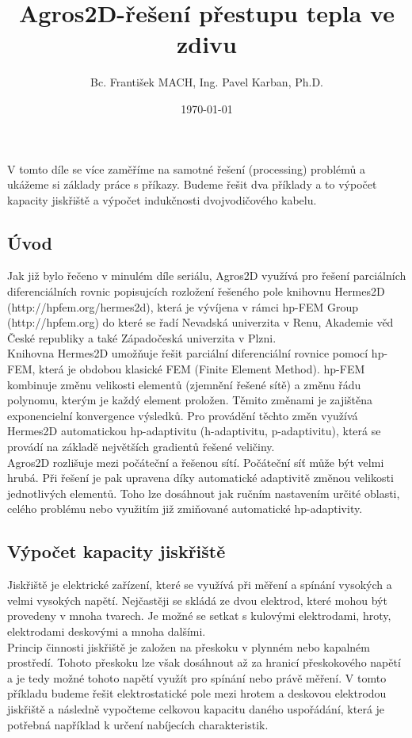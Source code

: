 \documentclass[a4paper, oneside]{article}
\begin{document}
\author{Bc. František MACH, Ing. Pavel Karban, Ph.D.}
\date{\today}
\title{Agros2D-řešení přestupu tepla ve zdivu}
\maketitle
 V tomto díle se více zaměříme na samotné řešení (processing) problémů a ukážeme si základy práce s příkazy. Budeme řešit dva příklady a to výpočet kapacity jiskřiště a výpočet indukčnosti dvojvodičového kabelu.
	
\tableofcontents
\newpage
 \subsection{Úvod}
Jak již bylo řečeno v minulém díle seriálu, Agros2D využívá pro řešení parciálních diferenciálních rovnic popisujcích rozložení řešeného pole knihovnu Hermes2D \\(http://hpfem.org/hermes2d), která je vývíjena v rámci hp-FEM Group \\(http://hpfem.org) do které se řadí Nevadská univerzita v Renu, Akademie věd České republiky a také Západočeská univerzita v Plzni.\\

	Knihovna Hermes2D umožňuje řešit parciální diferenciální rovnice pomocí hp-FEM, která je obdobou klasické FEM (Finite Element Method). hp-FEM kombinuje změnu velikosti elementů (zjemnění řešené sítě) a změnu řádu polynomu, kterým je každý element proložen. Těmito změnami je zajištěna exponencielní konvergence výsledků. Pro provádění těchto změn využívá Hermes2D automatickou hp-adaptivitu (h-adaptivitu, p-adaptivitu), která se provádí na základě největších gradientů řešené veličiny.\\

	Agros2D rozlišuje mezi počáteční a řešenou sítí. Počáteční síť může být velmi hrubá. Při řešení je pak upravena díky automatické adaptivitě změnou velikosti jednotlivých elementů. Toho lze dosáhnout jak ručním nastavením určité oblasti, celého problému nebo využitím již zmiňované automatické hp-adaptivity.\\
\newpage
\subsection{Výpočet kapacity jiskřiště} 
Jiskřiště je elektrické zařízení, které se využívá při měření a spínání vysokých a velmi vysokých napětí. Nejčastěji se skládá ze dvou elektrod, které mohou být provedeny v mnoha tvarech. Je možné se setkat s kulovými elektrodami, hroty, elektrodami deskovými a mnoha dalšími.\\
Princip činnosti jiskřiště je založen na přeskoku v plynném nebo kapalném prostředí. Tohoto přeskoku lze však dosáhnout až za hranicí přeskokového napětí a je tedy možné tohoto napětí využít pro spínání nebo právě měření. V tomto příkladu budeme řešit elektrostatické pole mezi hrotem a deskovou elektrodou jiskřiště a následně vypočteme celkovou kapacitu daného uspořádání, která je potřebná například k určení nabíjecích charakteristik.\\
\end{document}
